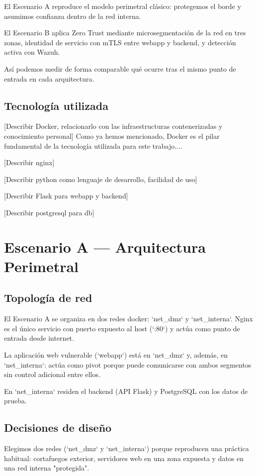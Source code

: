 \documentclass[11pt,spanish,listoffigures,listoftables]{tfgetsinf}
\begin{document}
    El Escenario A reproduce el modelo perimetral clásico: protegemos el borde y asumimos confianza dentro de la red interna. 
    
    El Escenario B aplica Zero Trust mediante microsegmentación de la red en tres zonas, identidad de servicio con mTLS entre webapp y backend, y detección activa con Wazuh. 
    
    Así podemos medir de forma comparable qué ocurre tras el mismo punto de entrada en cada arquitectura.

        \subsection{Tecnología utilizada}
        [Describir Docker, relacionarlo con las infraestructuras contenerizadas y conocimiento personal]
        Como ya hemos mencionado, Docker es el pilar fundamental de la tecnología utilizada para este trabajo....

        [Describir nginx]
        
        [Describir python como lenguaje de desarrollo, facilidad de uso]
        
        [Describir Flask para webapp y backend]

        [Describir postgresql para db]
    
    \section{Escenario A — Arquitectura Perimetral}
        \subsection{Topología de red}
            El Escenario A se organiza en dos redes docker: `net\_dmz` y `net\_interna`. Nginx es el único servicio con puerto expuesto al host (`:80`) y actúa como punto de entrada desde internet.
            
            La aplicación web vulnerable (`webapp`) está en `net\_dmz` y, además, en `net\_interna`: actúa como pivot porque puede comunicarse con ambos segmentos sin control adicional entre ellos. 
            
            En `net\_interna` residen el backend (API Flask) y PostgreSQL con los datos de prueba.
        
        \subsection{Decisiones de diseño}
        Elegimos dos redes (`net\_dmz` y `net\_interna`) porque reproducen una práctica habitual: cortafuegos exterior, servidores web en una zona expuesta y datos en una red interna "protegida".
        
\end{document}
